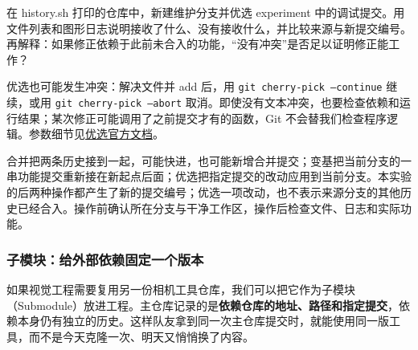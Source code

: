 \begin{exercise}\label{ex:v1-git-cherry-pick}
在 history.sh 打印的仓库中，新建维护分支并优选 experiment 中的调试提交。用文件列表和图形日志说明接收了什么、没有接收什么，并比较来源与新提交编号。再解释：如果修正依赖于此前未合入的功能，“没有冲突”是否足以证明修正能工作？
\end{exercise}
优选也可能发生冲突：解决文件并 add 后，用 \texttt{git cherry-pick --continue} 继续，或用 \texttt{git cherry-pick --abort} 取消。即使没有文本冲突，也要检查依赖和运行结果；某次修正可能调用了之前提交才有的函数，Git 不会替我们检查程序逻辑。参数细节见\href{https://git-scm.com/docs/git-cherry-pick}{优选官方文档}。
\begin{conclusion}
合并把两条历史接到一起，可能快进，也可能新增合并提交；变基把当前分支的一串功能提交重新接在新起点后面；优选把指定提交的改动应用到当前分支。本实验的后两种操作都产生了新的提交编号；优选一项改动，也不表示来源分支的其他历史已经合入。操作前确认所在分支与干净工作区，操作后检查文件、日志和实际功能。
\end{conclusion}

\subsubsection{子模块：给外部依赖固定一个版本}
\label{sec:git-submodule}
如果视觉工程需要复用另一份相机工具仓库，我们可以把它作为子模块（Submodule）放进工程。主仓库记录的是\textbf{依赖仓库的地址、路径和指定提交}，依赖本身仍有独立的历史。这样队友拿到同一次主仓库提交时，就能使用同一版工具，而不是今天克隆一次、明天又悄悄换了内容。

